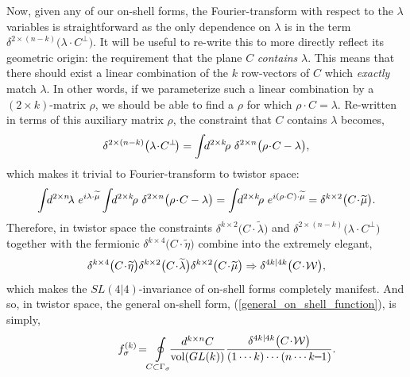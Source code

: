 \documentclass[12pt,hyperref,compress]{JHEP3}
\newcommand{\eq}[1]{\begin{equation}#1\end{equation}}
\newcommand{\mi}{{\rm\rule[2.4pt]{6pt}{0.65pt}}}
\begin{document}
{Now, given any of our on-shell forms, the Fourier-transform with respect to the $\lambda$ variables is straightforward as the only dependence on $\lambda$ is in the term $\delta^{2\times(n-k)}\big(\lambda\cdot C^\perp\!\big)$. It will be useful to re-write this to more directly reflect its geometric origin: the requirement that the plane $C$ {\it contains} $\lambda$. This means that there should exist a linear combination of the $k$ row-vectors of $C$ which {\it exactly} match $\lambda$. In other words, if we parameterize such a linear combination by a $(2\!\times\!k)$-matrix $\rho$, we should be able to find a $\rho$ for which $\rho\cdot C=\lambda$. Re-written in terms of this auxiliary matrix $\rho$, the constraint that $C$ contains $\lambda$ becomes,
\vspace{-.2cm}\eq{\delta^{2\times(n-k)}\big(\lambda\!\cdot\!C^\perp\!\big)=\int\!\!d^{2\times k}\!\rho\,\,\delta^{2\times n}\big(\rho\!\cdot\!C-\lambda\big),\vspace{-.2cm}} which makes it trivial to Fourier-transform to twistor space: \vspace{-.2cm}\eq{\int\!\!d^{2\times n}\!\lambda\,\,e^{i\lambda \cdot\widetilde\mu}\int\!\!d^{2\times k}\!\rho\,\,\delta^{2\times n}\big(\rho\!\cdot\!C-\lambda\big)=\int\!\!d^{2\times k}\!\rho\,\,e^{i(\rho\cdot C)\cdot\widetilde\mu}=\delta^{k\times2}\big(C\!\cdot\!\widetilde\mu\big).\vspace{-.2cm}}
Therefore, in twistor space the constraints $\delta^{k\times2}\big(C\!\cdot\!\widetilde\lambda)$ and $\delta^{2\times(n-k)}\big(\lambda\!\cdot\!C^\perp\!\big)$ together with the fermionic $\delta^{k\times4}\big(C\!\cdot\widetilde\eta\big)$ combine into the extremely elegant,
\vspace{-.2cm}\eq{\delta^{k\times4}\big(C\!\cdot\!\widetilde\eta\big)\delta^{k\times2}\big(C\!\cdot\!\widetilde\lambda\big)\delta^{k\times2}\big(C\!\cdot\!\widetilde\mu\big)\Rightarrow\delta^{4k|4k}\big(C\!\cdot\!\mathcal{W}\big),\vspace{-.2cm}}
which makes the $SL(4|4)$-invariance of on-shell forms completely manifest. And so, in twistor space, the general on-shell form, (\ref{general_on_shell_function}), is simply,
\vspace{-.2cm}\eq{\hspace{-0.0cm}f_\sigma^{(k)}\!=\!\oint\limits_{C\subset\Gamma_\sigma}\!\!\!\frac{d^{k \times n} C}{\mathrm{vol}(GL(k))}\frac{\delta^{4k|4k}\big(C\!\cdot\!\mathcal{W}\big)}{(1\cdots k)\cdots(n\cdots k\mi1)}.\hspace{-1.3cm}\vspace{-.2cm}\label{general_on_shell_function_in_twistor_space}}

}
\end{document}
